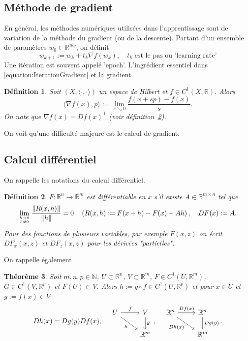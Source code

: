 \documentclass[11pt,a4paper, french]{article}
\newcommand{\cdtriangle}[6]{
\begin{tikzcd}[ampersand replacement=\&] {#1}  \arrow[swap]{rd}{{#4}} \arrow{r}{{#5}}  \& {#2} \arrow{d}{{#6}}\\ \& {#3}  \end{tikzcd}
}
\newcommand{\N}{\mathbb N}
\newcommand{\R}{\mathbb R}
\newcommand{\norm}[1]{\|#1\|}
\newcommand{\scp}[2]{\langle#1,#2\rangle}
\newcommand{\transpose}[1]{{#1}^{\mathsf{T}}}
\newtheorem{theorem}{Théorème}[section]
\newtheorem{definition}[theorem]{Définition}
\begin{document}
\subsection{Méthode de gradient}\label{subsec:}
%
En général, les méthodes numériques utilisées dans l'apprentissage sont de variation de la méthode du gradient (ou de la descente).
Partant d'un ensemble de paramètres $w_0\in \R^{n_W}$, on définit
%
\begin{equation}\label{equation:IterationGradient}
w_{k+1} := w_k + t_k \nabla f(w_k),\quad \mbox{$t_k$ est le pas ou 'learning rate'}
\end{equation}
%
Une itération est souvent appelé 'epoch'. L'ingrédient essentiel dans \eqref{equation:IterationGradient} et la gradient.
%
\begin{definition}\label{definition:grad}
Soit $(X,\scp{\cdot}{\cdot})$ un espace de Hilbert et  $f\in C^1(X,\R)$. Alors
%
\begin{equation}\label{equation:}
\scp{\nabla f(x)}{p} := \lim_{s\searrow0}\frac{f(x+sp)-f(x)}{s}.
\end{equation}
%
On note que $\nabla f(x) = \transpose{Df(x)}$ (voir définition~\ref{definition:deriv}).
\end{definition}
%
On voit qu'une difficulté majeure est le calcul de gradient.
%
\subsection{Calcul différentiel}\label{subsec:}
%
%
On rappelle les notations du calcul différentiel. 
%
\begin{definition}\label{definition:deriv}
$F:\R^n\to\R^m$ est différentiable en $x$ s'il existe $A\in\R^{m\times n}$ tel que 
\begin{align*}
\lim_{h\to 0\atop h\ne0}\frac{\norm{R(x,h)}}{\norm{h}} = 0\quad \left(R(x,h) := F(x+h)-F(x) - Ah\right),\quad DF(x) := A.
\end{align*}
Pour des fonctions de plusieurs variables, par exemple $F(x,z)$ on écrit 
$DF_x(x,z)$ et $DF_z(x,z)$ pour les dérivées  "partielles".
\end{definition}
%
On rappelle également
%
\begin{theorem}\label{theorem:}
Soit $m,n,p\in\N$, $U\subset\R^n$, $V\subset \R^m$, $F\in C^1(U,\R^m)$, $G\in C^1(V,\R^p)$ et $F(U)\subset V$. Alors $h := g\circ f\in C^1(U,\R^p)$ et 
pour $x\in U$ et $y:=f(x)\in V$
%
\begin{equation}\label{eq:calcdiff_deriveecompo}
Dh(x) = Dg(y) Df(x),\quad\cdtriangle{U}{V}{\R^m}{h}{f}{g},\quad\cdtriangle{\R^n}{\R^n}{\R^m}{Dh(x)}{Df(x)}{Dg(y)}.
\end{equation}
%
\end{theorem}
%
\end{document}
